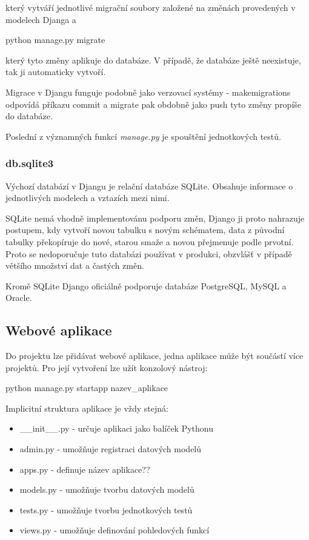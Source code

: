 který vytváří jednotlivé migrační soubory založené na změnách provedených v modelech Djanga a 

\begin{center}
\textsf{python manage.py migrate}
\end{center}

který tyto změny aplikuje do databáze. V případě, že databáze ještě neexistuje, tak ji automaticky vytvoří.

Migrace v Djangu funguje podobně jako verzovací systémy - \textsf{makemigrations} odpovídá příkazu \textsf{commit} a \textsf{migrate} pak obdobně jako \textsf{push} tyto změny propíše do databáze.

Poslední z významných funkcí \textit{manage.py} je spouštění jednotkových testů.

\subsubsection{db.sqlite3}
Výchozí databází v Djangu je relační databáze SQLite. Obsahuje informace o jednotlivých modelech a vztazích mezi nimi.

SQLite nemá vhodně implementovánu podporu změn, Django ji proto nahrazuje postupem, kdy vytvoří novou tabulku s novým schématem, data z původní tabulky překopíruje do nové, starou smaže a novou přejmenuje podle prvotní. Proto se nedoporučuje tuto databázi používat v produkci, obzvlášť v případě většího množství dat a častých změn.

Kromě SQLite Django oficiálně podporuje databáze PostgreSQL, MySQL a Oracle.

\subsection{Webové aplikace}
\label{django-app}
Do projektu lze přidávat webové aplikace, jedna aplikace může být součástí více projektů. Pro její vytvoření lze užít konzolový nástroj:

\begin{center}
\textsf{python manage.py startapp nazev\_aplikace}
\end{center}

Implicitní struktura aplikace je vždy stejná:

\begin{itemize}
\item \textsf{\_\_init\_\_.py} - určuje aplikaci jako balíček Pythonu
\item \textsf{admin.py} - umožňuje registraci datových modelů
\item \textsf{apps.py} - definuje název aplikace??
\item \textsf{models.py} - umožňuje tvorbu datových modelů
\item \textsf{tests.py} - umožňuje tvorbu jednotkových testů
\item \textsf{views.py} - umožňuje definování pohledových funkcí
\end{itemize}

